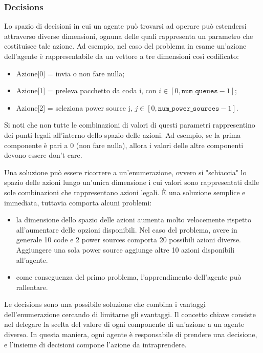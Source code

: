 \documentclass[conference]{IEEEtran}
\newcommand{\code}[1]{\texttt{#1}}
\begin{document}
\subsubsection{Decisions}
\label{subsec:Decisions}
Lo spazio di decisioni in cui un agente può trovarsi ad operare può estendersi
attraverso
diverse dimensioni, ognuna delle quali rappresenta un parametro che costituisce
tale azione. Ad esempio, nel caso del problema in esame un'azione dell'agente è
rappresentabile da un vettore a tre dimensioni così codificato:
\begin{itemize}
\item Azione[0] = invia o non fare nulla;
\item Azione[1] = preleva pacchetto da coda i, con $i \in [0, \code{num\_queues} - 1]$;
\item Azione[2] = seleziona power source j, $j \in [0, \code{num\_power\_sources} - 1]$.
\end{itemize}
Si noti che non tutte le combinazioni di valori di questi parametri
rappresentino dei punti legali all'interno dello spazio delle azioni.
Ad esempio, se la prima componente è pari a 0 (non fare nulla), allora i valori delle
altre componenti devono essere don't care.

Una soluzione può essere ricorrere a un'enumerazione, ovvero si "schiaccia"
lo spazio delle azioni lungo un'unica dimensione i cui valori sono rappresentati 
dalle sole combinazioni che rappresentano azioni legali. È una soluzione semplice e
immediata, tuttavia comporta alcuni problemi:
\begin{itemize}
    \item la dimensione dello spazio delle azioni aumenta molto velocemente rispetto
    all'aumentare delle opzioni disponibili. Nel caso del problema, avere in generale
    10 code e 2 power sources comporta 20 possibili azioni diverse. Aggiungere una
    sola power source aggiunge altre 10 azioni disponibili all'agente.
    \item come conseguenza del primo problema, l'apprendimento dell'agente può
    rallentare. %
\end{itemize}
Le decisions sono una possibile soluzione che combina i vantaggi dell'enumerazione
cercando di limitarne gli svantaggi. Il concetto chiave consiste nel delegare la scelta
del valore di ogni componente di un'azione a un agente diverso. In questa maniera,
ogni agente è responsabile di prendere una decisione, e l'insieme di decisioni compone
l'azione da intraprendere. 
\end{document}
